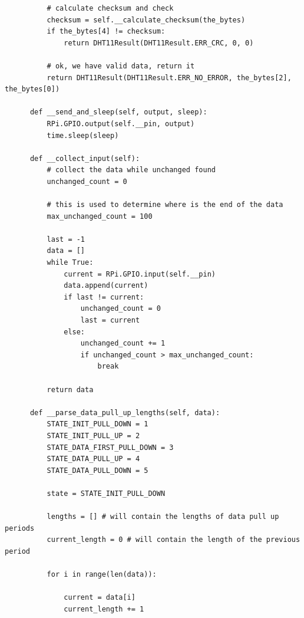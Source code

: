 \documentclass[10pt,a4paper]{article}
\begin{document}
\begin{verbatim}
          # calculate checksum and check
          checksum = self.__calculate_checksum(the_bytes)
          if the_bytes[4] != checksum:
              return DHT11Result(DHT11Result.ERR_CRC, 0, 0)

          # ok, we have valid data, return it
          return DHT11Result(DHT11Result.ERR_NO_ERROR, the_bytes[2], the_bytes[0])

      def __send_and_sleep(self, output, sleep):
          RPi.GPIO.output(self.__pin, output)
          time.sleep(sleep)

      def __collect_input(self):
          # collect the data while unchanged found
          unchanged_count = 0

          # this is used to determine where is the end of the data
          max_unchanged_count = 100

          last = -1
          data = []
          while True:
              current = RPi.GPIO.input(self.__pin)
              data.append(current)
              if last != current:
                  unchanged_count = 0
                  last = current
              else:
                  unchanged_count += 1
                  if unchanged_count > max_unchanged_count:
                      break

          return data

      def __parse_data_pull_up_lengths(self, data):
          STATE_INIT_PULL_DOWN = 1
          STATE_INIT_PULL_UP = 2
          STATE_DATA_FIRST_PULL_DOWN = 3
          STATE_DATA_PULL_UP = 4
          STATE_DATA_PULL_DOWN = 5

          state = STATE_INIT_PULL_DOWN

          lengths = [] # will contain the lengths of data pull up periods
          current_length = 0 # will contain the length of the previous period

          for i in range(len(data)):

              current = data[i]
              current_length += 1


\end{verbatim}
\end{document}
